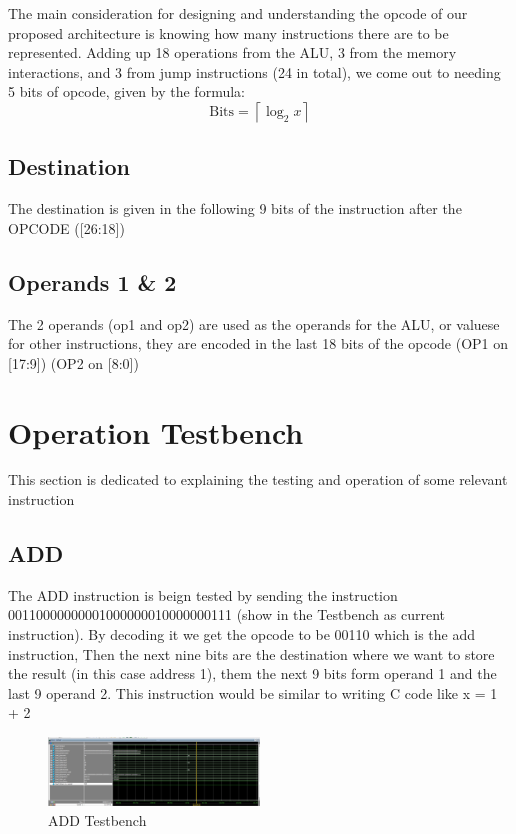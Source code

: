 \documentclass[9pt,a4paper,twoside]{tau}
\begin{document}
        The main consideration for designing and understanding the opcode of our proposed architecture is knowing how many instructions there are to be represented. Adding up 18 operations from the ALU, 3 from the memory interactions, and 3 from jump instructions (24 in total), we come out to needing 5 bits of opcode, given by the formula:
        \begin{equation}
            \text{Bits} = \left\lceil \log_{2}{x} \right\rceil
        \end{equation}

        
        \subsection{Destination}
        The destination is given in the following 9 bits of the instruction after the OPCODE ([26:18]) 




        \subsection{Operands 1 \& 2}
        The 2 operands (op1 and op2) are used as the operands for the ALU, or valuese for other instructions, they are encoded in the last 18 bits of the opcode (OP1 on [17:9]) (OP2 on [8:0])
        
    
\section{Operation Testbench}
This section is dedicated to explaining the testing and operation of some relevant instruction
        \subsection{ADD}

            The ADD instruction is beign tested by sending the instruction 00110000000001000000010000000111 (show in the Testbench as current instruction). By decoding it we get the opcode to be 00110 which is the add instruction, Then the next nine bits are the destination where we want to store the result (in this case address 1), them the next 9 bits form operand 1 and the last 9 operand 2. This instruction would be similar to writing C code like x = 1 + 2

            \begin{figure}[h]  %
                \centering  %
                \includegraphics[width=0.5\textwidth]{images_tb/add_tb.png}
                \caption{ADD Testbench}
                \label{fig:ISA Format}
            \end{figure}
\end{document}
